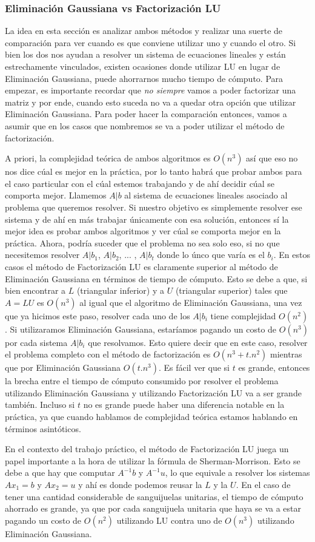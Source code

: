 \subsubsection{Eliminación Gaussiana vs Factorización LU}
La idea en esta sección es analizar ambos métodos y realizar una suerte de comparación para ver cuando es que conviene utilizar uno y cuando el otro. Si bien los dos nos ayudan a resolver un sistema de ecuaciones lineales y están estrechamente vinculados, existen ocasiones donde utilizar LU en lugar de Eliminación Gaussiana, puede ahorrarnos mucho tiempo de cómputo. Para empezar, es importante recordar que \textit{no siempre} vamos a poder factorizar una matriz y por ende, cuando esto suceda no va a quedar otra opción que utilizar Eliminación Gaussiana. Para poder hacer la comparación entonces, vamos a asumir que en los casos que nombremos se va a poder utilizar el método de factorización.
\par A priori, la complejidad teórica de ambos algoritmos es $O(n^3)$ así que eso no nos dice cúal es mejor en la práctica, por lo tanto habrá que probar ambos para el caso particular con el cúal estemos trabajando y de ahí decidir cúal se comporta mejor. Llamemos $A|b$ al sistema de ecuaciones lineales asociado al problema que queremos resolver. Si nuestro objetivo es simplemente resolver ese sistema y de ahí en más trabajar únicamente con esa solución, entonces sí la mejor idea es probar ambos algoritmos y ver cúal se comporta mejor en la práctica. Ahora, podría suceder que el problema no sea solo eso, si no que necesitemos resolver $A|b_1$, $A|b_2$, ... , $A|b_t$ donde lo únco que varía es el $b_i$. En estos casos el método de Factorización LU es claramente superior al método de Eliminación Gaussiana en términos de tiempo de cómputo. Esto se debe a que, si bien encontrar a $L$ (triangular inferior) y a $U$ (triangular superior) tales que $A = LU$ es $O(n^3)$ al igual que el algoritmo de Eliminación Gaussiana, una vez que ya hicimos este paso, resolver cada uno de los $A|b_i$ tiene complejidad $O(n^2)$. Si utilizaramos Eliminación Gaussiana, estaríamos pagando un costo de $O(n^3)$ por cada sistema $A|b_i$ que resolvamos. Esto quiere decir que en este caso, resolver el problema completo con el método de factorización es $O(n^3 + t.n^2)$ mientras que por Eliminación Gaussiana $O(t.n^3)$. Es fácil ver que si $t$ es grande, entonces la brecha entre el tiempo de cómputo consumido por resolver el problema utilizando Eliminación Gaussiana y utilizando Factorización LU va a ser grande también. Incluso si $t$ no es grande puede haber una diferencia notable en la práctica, ya que cuando hablamos de complejidad teórica estamos hablando en términos asintóticos.
\par En el contexto del trabajo práctico, el método de Factorización LU juega un papel importante a la hora de utilizar la fórmula de Sherman-Morrison. Esto se debe a que hay que computar $A^{-1}b$ y $A^{-1}u$, lo que equivale a resolver los sistemas $Ax_1 = b$ y $Ax_2 = u$ y ahí es donde podemos reusar la $L$ y la $U$. En el caso de tener una cantidad considerable de sanguijuelas unitarias, el tiempo de cómputo ahorrado es grande, ya que por cada sanguijuela unitaria que haya se va a estar pagando un costo de $O(n^2)$ utilizando LU contra uno de $O(n^3)$ utilizando Eliminación Gaussiana.
